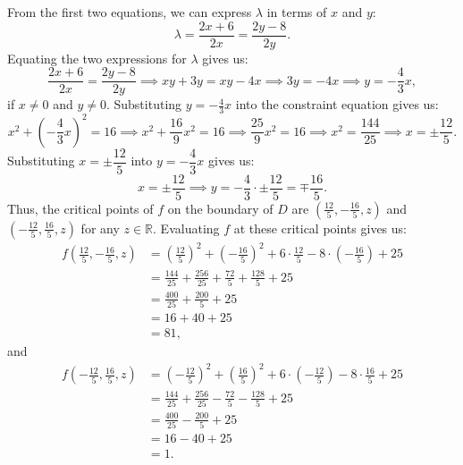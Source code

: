 \documentclass[11pt]{article}
\begin{document}
From the first two equations, we can express \(\lambda\) in terms of \(x\) and \(y\):
\[\lambda = \frac{2x + 6}{2x} = \frac{2y - 8}{2y}.\]
Equating the two expressions for \(\lambda\) gives us:
\[\frac{2x + 6}{2x} = \frac{2y - 8}{2y} \implies xy + 3y = xy - 4x \implies 3y = -4x \implies y = -\frac{4}{3}x, \]
if \(x \neq 0\) and \(y \neq 0\). Substituting \(y = -\frac{4}{3}x\) into the constraint equation gives us:
\[x^2 + \left(-\frac{4}{3}x\right)^2 = 16 \implies x^2 + \frac{16}{9}x^2 = 16 \implies \frac{25}{9}x^2 = 16 \implies x^2 = \frac{144}{25} \implies x = \pm \frac{12}{5}.\]
Substituting \(x = \pm \dfrac{12}{5}\) into \(y = -\dfrac{4}{3}x\) gives us:
\[x = \pm \frac{12}{5} \implies y = -\frac{4}{3} \cdot \pm \frac{12}{5} = \mp \frac{16}{5}.\]
Thus, the critical points of \(f\) on the boundary of \(D\) are \(\left(\frac{12}{5}, -\frac{16}{5}, z\right)\) and \(\left(-\frac{12}{5}, \frac{16}{5}, z\right)\) for any \(z \in \mathbb{R}\).
Evaluating \(f\) at these critical points gives us:
\begin{align*}
f\left(\frac{12}{5}, -\frac{16}{5}, z\right) & = \left(\frac{12}{5}\right)^2 + \left(-\frac{16}{5}\right)^2 + 6 \cdot \frac{12}{5} - 8 \cdot \left(-\frac{16}{5}\right) + 25 \\
& = \frac{144}{25} + \frac{256}{25} + \frac{72}{5} + \frac{128}{5} + 25 \\
& = \frac{400}{25} + \frac{200}{5} + 25 \\
& = 16 + 40 + 25 \\
& = 81,
\end{align*}
and
\begin{align*}
f\left(-\frac{12}{5}, \frac{16}{5}, z\right) & = \left(-\frac{12}{5}\right)^2 + \left(\frac{16}{5}\right)^2 + 6 \cdot \left(-\frac{12}{5}\right) - 8 \cdot \frac{16}{5} + 25 \\
& = \frac{144}{25} + \frac{256}{25} - \frac{72}{5} - \frac{128}{5} + 25 \\
& = \frac{400}{25} - \frac{200}{5} + 25 \\
& = 16 - 40 + 25 \\
& = 1.
\end{align*}

\pagebreak
\end{document}
